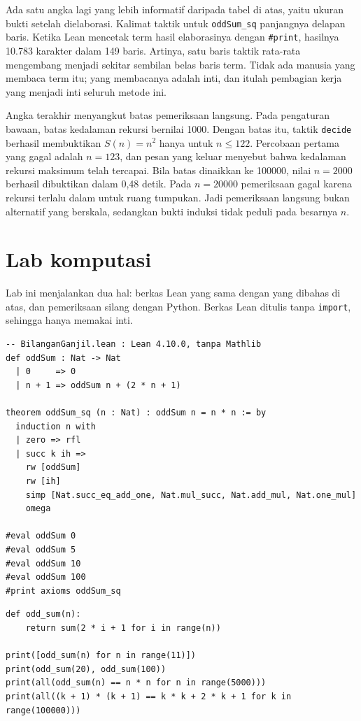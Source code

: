 Ada satu angka lagi yang lebih informatif daripada tabel di atas, yaitu ukuran bukti setelah
dielaborasi. Kalimat taktik untuk \texttt{oddSum\_sq} panjangnya delapan baris. Ketika Lean
mencetak term hasil elaborasinya dengan \texttt{\#print}, hasilnya 10.783 karakter dalam 149
baris. Artinya, satu baris taktik rata-rata mengembang menjadi sekitar sembilan belas baris term.
Tidak ada manusia yang membaca term itu; yang membacanya adalah inti, dan itulah pembagian kerja
yang menjadi inti seluruh metode ini.

Angka terakhir menyangkut batas pemeriksaan langsung. Pada pengaturan bawaan, batas kedalaman
rekursi bernilai 1000. Dengan batas itu, taktik \texttt{decide} berhasil membuktikan
$S(n)=n^{2}$ hanya untuk $n\le 122$. Percobaan pertama yang gagal adalah $n=123$, dan pesan yang
keluar menyebut bahwa kedalaman rekursi maksimum telah tercapai. Bila batas dinaikkan ke 100000,
nilai $n=2000$ berhasil dibuktikan dalam 0,48 detik. Pada $n=20000$ pemeriksaan gagal karena
rekursi terlalu dalam untuk ruang tumpukan. Jadi pemeriksaan langsung bukan alternatif yang
berskala, sedangkan bukti induksi tidak peduli pada besarnya $n$.

\section{Lab komputasi}


Lab ini menjalankan dua hal: berkas Lean yang sama dengan yang dibahas di atas, dan pemeriksaan
silang dengan Python. Berkas Lean ditulis tanpa \texttt{import}, sehingga hanya memakai inti.

\begin{lab}
\begin{verbatim}
-- BilanganGanjil.lean : Lean 4.10.0, tanpa Mathlib
def oddSum : Nat -> Nat
  | 0     => 0
  | n + 1 => oddSum n + (2 * n + 1)

theorem oddSum_sq (n : Nat) : oddSum n = n * n := by
  induction n with
  | zero => rfl
  | succ k ih =>
    rw [oddSum]
    rw [ih]
    simp [Nat.succ_eq_add_one, Nat.mul_succ, Nat.add_mul, Nat.one_mul]
    omega

#eval oddSum 0
#eval oddSum 5
#eval oddSum 10
#eval oddSum 100
#print axioms oddSum_sq
\end{verbatim}

\begin{verbatim}
def odd_sum(n):
    return sum(2 * i + 1 for i in range(n))

print([odd_sum(n) for n in range(11)])
print(odd_sum(20), odd_sum(100))
print(all(odd_sum(n) == n * n for n in range(5000)))
print(all((k + 1) * (k + 1) == k * k + 2 * k + 1 for k in range(100000)))
\end{verbatim}
\end{lab}

